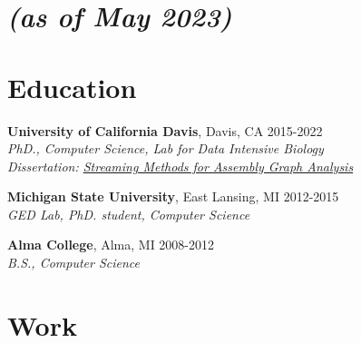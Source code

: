 \documentclass[resmargin,12pt]{camille_resume}
\begin{document}
\address{{\bf Permanent Address}\\
By Request\\
Davis, CA}
\address{
\hfill {\bf Contact}\\
\hfill cswel@ucdavis.edu\\
\hfill camille.scott.w@gmail.com
}
\pagestyle{plain}

    
\begin{resume}



\section{\small \it{(as of May 2023)}}

\section{\mysidestyle Education}

{\bf University of California Davis}, Davis, CA \hfill 2015-2022\\
{\em PhD., Computer Science, Lab for Data Intensive Biology}\\
{\em Dissertation: \href{https://github.com/camillescott/dissertation}{Streaming Methods for
    Assembly Graph Analysis}}

\vspace{1mm}

{\bf Michigan State University}, East Lansing, MI \hfill 2012-2015\\
{\em GED Lab, PhD. student, Computer Science}

\vspace{1mm}

{\bf Alma College}, Alma, MI \hfill 2008-2012\\
{\em B.S., Computer Science}

\vspace{2mm}

\section{\mysidestyle Work}

\begin{list1}


\end{list1}
\end{resume}
\end{document}

